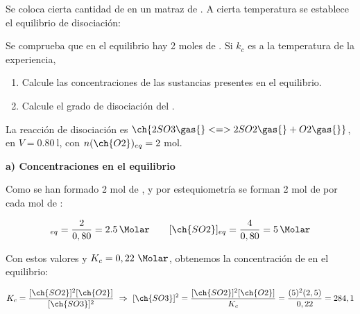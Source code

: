 \begin{exerciseEVAU}
    Se coloca cierta cantidad de  en un matraz de .
    A cierta temperatura se establece el equilibrio de disociación:
    \begin{center}
    \end{center}
    Se comprueba que en el equilibrio hay 2 moles de .
    Si \(k_c\) es  a la temperatura de la experiencia,
    \begin{enumerate}[label=\letraminuscula]
        \item Calcule las concentraciones de las sustancias presentes en el equilibrio.
        \item Calcule el grado de disociación del .
    \end{enumerate}


    \begin{solu}

        La reacción de disociación es \(\ch{2 SO3 \gas{} <=> 2 SO2 \gas{} + O2 \gas{}}\), en \(V = \SI{0.80}{\litre}\), con \(n(\ch{O2})_{eq} = 2\) mol.

        \textbf{a) Concentraciones en el equilibrio}

        Como se han formado 2 mol de , y por estequiometría se forman 2 mol de  por cada mol de :

        \begin{equation*}
            [\ch{O2}]_{eq} = \dfrac{2}{0,80} = \SI{2.5}{\Molar} \qquad [\ch{SO2}]_{eq} = \dfrac{4}{0,80} = \SI{5}{\Molar}
        \end{equation*}

        Con estos valores y \(K_c = 0,22\ \si{\Molar}\), obtenemos la concentración de  en el equilibrio:

        \begin{equation*}
            K_c = \dfrac{[\ch{SO2}]^2[\ch{O2}]}{[\ch{SO3}]^2} \ \Rightarrow \ [\ch{SO3}]^2 = \dfrac{[\ch{SO2}]^2[\ch{O2}]}{K_c} = \dfrac{(5)^2 (2,5)}{0,22} = 284,1
        \end{equation*}


\end{solu}
\end{exerciseEVAU}
